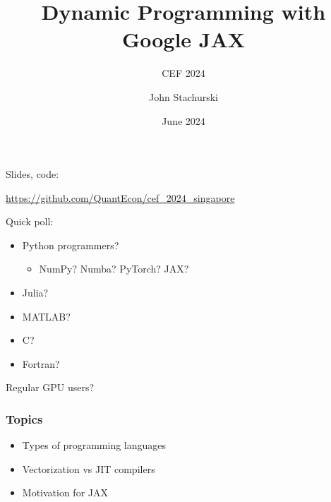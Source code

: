 \documentclass[
    xcolor={svgnames,dvipsnames},
    hyperref={colorlinks, citecolor=DeepPink4, linkcolor=DarkRed, urlcolor=DarkBlue}
    ]{beamer}  %
\title{Dynamic Programming with Google JAX}
\subtitle{CEF 2024}
\author{John Stachurski}
\date{June 2024}
\newcommand{\1}{\mathbbm 1}
\begin{document}
\begin{frame}
  \titlepage
\end{frame}




\begin{frame}
    
    Slides, code:

    \vspace{0.5em}
    \vspace{0.5em}
    \vspace{0.5em}
    \begin{center}
    \url{https://github.com/QuantEcon/cef_2024_singapore}
    \end{center}

\end{frame}

\begin{frame}
    
    Quick poll:

    \begin{itemize}
        \item Python programmers?
    \vspace{0.5em}
            \begin{itemize}
                \item NumPy?  Numba?  PyTorch? JAX?
            \end{itemize}
    \vspace{0.5em}
        \item Julia?
    \vspace{0.5em}
        \item MATLAB?
    \vspace{0.5em}
        \item C?
    \vspace{0.5em}
        \item Fortran?
    \end{itemize}


    \vspace{0.5em}
    \vspace{0.5em}
    Regular GPU users?
    
\end{frame}


\begin{frame}
    \frametitle{Topics}

    \begin{itemize}
        \item Types of programming languages
    \vspace{0.5em}
    \vspace{0.5em}
        \item Vectorization vs JIT compilers
    \vspace{0.5em}
    \vspace{0.5em}
        \item Motivation for JAX
    \end{itemize}
\end{frame}
\end{document}
